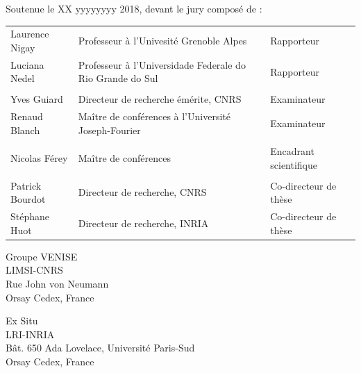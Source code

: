\begin{titlepage}

Soutenue le XX yyyyyyyy 2018, devant le jury composé de :\\

\begin{center}
	\begin{tabular}{l l l}
	
	Laurence Nigay		& Professeur à l'Univesité Grenoble Alpes					& Rapporteur				\\ 
	Luciana Nedel		& Professeur à l'Universidade Federale do Rio Grande do Sul	& Rapporteur				\\
						& 															&							\\ %
	Yves Guiard			& Directeur de recherche émérite, CNRS						& Examinateur				\\ 				
	Renaud Blanch		& Maître de conférences à l'Université Joseph-Fourier		& Examinateur				\\ 
						& 															&							\\ %
	Nicolas Férey		& Maître de conférences										& Encadrant scientifique	\\
						& 															&							\\ %
	Patrick Bourdot 	& Directeur de recherche, CNRS								& Co-directeur de thèse		\\ 
	Stéphane Huot		& Directeur de recherche, INRIA								& Co-directeur de thèse		\\ 
		
	\end{tabular}
\end{center}


\setlength{\columnsep}{7mm}
\setlength{\columnseprule}{0pt}

\begin{multicols}{2} 
\small 
\noindent Groupe VENISE					\\	
\noindent LIMSI-CNRS					\\
\noindent Rue John von Neumann			\\
 Orsay Cedex, France		\\	

\columnbreak

\raggedleft Ex Situ										\\
\noindent LRI-INRIA										\\
\noindent Bât. 650 Ada Lovelace, Université Paris-Sud	\\
 Orsay Cedex, France
\end{multicols}



\end{titlepage}